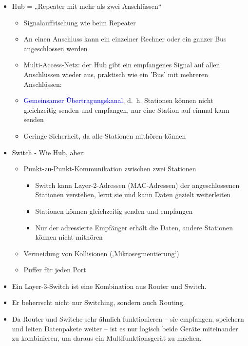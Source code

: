 \begin{itemize}
    \item Hub = „Repeater mit mehr als zwei Anschlüssen“
    \begin{itemize}
        \item Signalauffrischung wie beim Repeater
        \item An einen Anschluss kann ein einzelner Rechner oder ein ganzer Bus angeschlossen werden
        \item Multi-Access-Netz: der Hub gibt ein empfangenes Signal auf allen Anschlüssen wieder aus, praktisch wie ein 'Bus' mit mehreren Anschlüssen:
        \item \textcolor{blue}{Gemeinsamer Übertragungskanal}, d.\ h. Stationen können nicht gleichzeitig senden und empfangen, nur eine Station auf einmal kann senden
        \item Geringe Sicherheit, da alle Stationen mithören können
    \end{itemize}
    \item Switch - Wie Hub, aber:
    \begin{itemize}
        \item Punkt-zu-Punkt-Kommunikation zwischen zwei Stationen
        \begin{itemize}
            \item Switch kann Layer-2-Adressen (MAC-Adressen) der angeschlossenen Stationen verstehen, lernt sie und kann Daten gezielt weiterleiten
            \item Stationen können gleichzeitig senden und empfangen
            \item Nur der adressierte Empfänger erhält die Daten, andere Stationen können nicht mithören
        \end{itemize}
        \item Vermeidung von Kollisionen (‚Mikrosegmentierung‘)
        \item Puffer für jeden Port
    \end{itemize}
\end{itemize}

\begin{itemize}
    \item Ein Layer-3-Switch ist eine Kombination aus Router und Switch.
    \item Er beherrscht nicht nur Switching, sondern auch Routing.
    \item Da Router und Switche sehr ähnlich funktionieren – sie empfangen, speichern und leiten Datenpakete weiter – ist es nur logisch beide Geräte miteinander zu kombinieren, um daraus ein Multifunktionsgerät zu machen.
\end{itemize}

